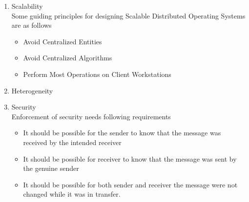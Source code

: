 \documentclass{beamer}
\begin{document}
\begin{frame}[allowframebreaks]
\begin{enumerate}
      		\framebreak
      	\item Scalability\\
      		\vspace{0.25cm}
      		Some guiding principles for designing Scalable Distributed Operating Systems are as follows
      		\begin{itemize}
      			\item Avoid Centralized Entities
      			\item Avoid Centralized Algorithms
      			\item Perform Most Operations on Client Workstations
      		\end{itemize}
      		\vspace{0.25cm}
      	\item Heterogeneity
      	\item Security
      		\\Enforcement of security needs following requirements
      		\begin{itemize}
      			\item It should be possible for the sender to know 
      			that the message was received by the intended 
      			receiver
      			\item It should be possible for receiver to know that 
      			the message was sent by the genuine sender
      			\item It should be possible for both sender and 
      			receiver the message were not changed while it was in 
      			transfer.
      		\end{itemize}
    \end{enumerate}   
    
\end{frame} 
\end{document}
